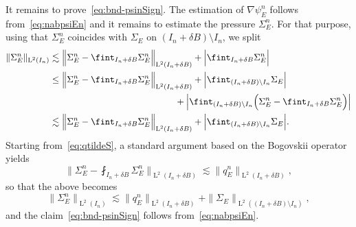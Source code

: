 \documentclass[JEP,XML,SOM,Unicode,published]{cedram}
\theoremstyle{plain}
\theoremstyle{definition}
\newcommand{\Ld}{\operatorname{L}}
\begin{document}
It remains to prove~\eqref{eq:bnd-psinSign}. The estimation of $\nabla\psi_E^n$ follows from~\eqref{eq:nabpsiEn} and it remains to estimate the pressure $\Sigma_E^n$. For that purpose, using that $\Sigma_E^n$ coincides with $\Sigma_E$ on $(I_n+\delta B)\setminus I_n$, we split
\begin{align*}
\|\Sigma_E^n\|_{\Ld^2(I_n)}
&\lesssim \Big\|\Sigma_E^n-\fint_{I_n+\delta B}\Sigma_E^n\Big\|_{\Ld^2(I_n+\delta B)}+\Big|\fint_{I_n+\delta B}\Sigma_E^n\Big|\\
&\le \Big\|\Sigma_E^n-\fint_{I_n+\delta B}\Sigma_E^n\Big\|_{\Ld^2(I_n+\delta B)}+\Big|\fint_{(I_n+\delta B)\setminus I_n}\Sigma_E\Big|\\
&\hspace{4.83cm}+\Big|\fint_{(I_n+\delta B)\setminus I_n}\Big(\Sigma_E^n-\fint_{I_n+\delta B}\Sigma_E^n\Big)\Big|\\
&\lesssim \Big\|\Sigma_E^n-\fint_{I_n+\delta B}\Sigma_E^n\Big\|_{\Ld^2(I_n+\delta B)}+\Big|\fint_{(I_n+\delta B)\setminus I_n}\Sigma_E\Big|.
\end{align*}
Starting from~\eqref{eq:qtildeS}, a standard argument based on the Bogovskii operator yields
\begin{equation*}
\Big\|\Sigma_E^n-\fint_{I_n+\delta B}\Sigma_E^n\Big\|_{\Ld^2(I_n+\delta B)}\lesssim \|q_E^n\|_{\Ld^2(I_n+\delta B)},
\end{equation*}
so that the above becomes
\[\|\Sigma_E^n\|_{\Ld^2(I_n)}\lesssim \|q_E^n\|_{\Ld^2(I_n+\delta B)}+\|\Sigma_E\|_{\Ld^2((I_n+\delta B)\setminus I_n)},\]
and the claim~\eqref{eq:bnd-psinSign} follows from~\eqref{eq:nabpsiEn}.
\end{document}
